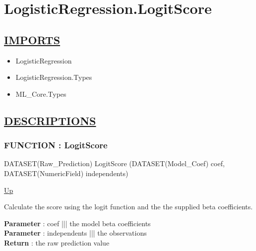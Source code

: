 \chapter*{LogisticRegression.LogitScore}
\hypertarget{ecldoc:toc:LogisticRegression.LogitScore}{}

\section*{\underline{IMPORTS}}
\begin{itemize}
\item LogisticRegression
\item LogisticRegression.Types
\item ML\_Core.Types
\end{itemize}

\section*{\underline{DESCRIPTIONS}}
\subsection*{FUNCTION : LogitScore}
\hypertarget{ecldoc:logisticregression.logitscore}{}
\begin{minipage}[t]{\textwidth}
\begin{flushleft}
DATASET(Raw\_Prediction) LogitScore (DATASET(Model\_Coef) coef, DATASET(NumericField) independents)
\end{flushleft}
\end{minipage}
\hyperlink{ecldoc:toc:LogisticRegression}{Up}

\par
Calculate the score using the logit function and the the supplied beta coefficients.
\par
\textbf{Parameter} : coef ||| the model beta coefficients \\
\textbf{Parameter} : independents ||| the observations \\
\textbf{Return} : the raw prediction value \\

